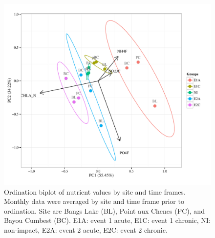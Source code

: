 \documentclass[letterpaper,12pt]{article}\usepackage[]{graphicx}\usepackage[]{color}
\makeatletter
\def\maxwidth{ %
  \ifdim\Gin@nat@width>\linewidth
    \linewidth
  \else
    \Gin@nat@width
  \fi
}
\makeatother
\begin{document}
\clearpage

\begin{figure}[!ht]

{\centering \includegraphics[width=\maxwidth]{figs/pcafig-1} 

}

\caption[Ordination biplot of nutrient values by site and time frames]{Ordination biplot of nutrient values by site and time frames. Monthly data were averaged by site and time frame prior to ordination.  Site are Bangs Lake (BL), Point aux Chenes (PC), and Bayou Cumbest (BC). E1A: event 1 acute, E1C: event 1 chronic, NI: non-impact, E2A: event 2 acute, E2C: event 2 chronic.}\label{fig:pcafig}
\end{figure}


\clearpage

\end{document}
